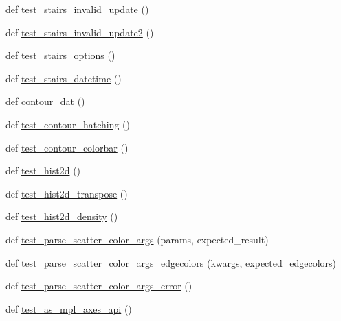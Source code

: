 \begin{DoxyCompactItemize}
\item 
def \hyperlink{namespacematplotlib_1_1tests_1_1test__axes_a11d3c5e980e30c826b84bbf145679e2f}{test\+\_\+stairs\+\_\+invalid\+\_\+update} ()
\item 
def \hyperlink{namespacematplotlib_1_1tests_1_1test__axes_a4537c0ae90a1171901db9b5c314dfbbf}{test\+\_\+stairs\+\_\+invalid\+\_\+update2} ()
\item 
def \hyperlink{namespacematplotlib_1_1tests_1_1test__axes_af69067a72b2dcc2d11f9943276b46e43}{test\+\_\+stairs\+\_\+options} ()
\item 
def \hyperlink{namespacematplotlib_1_1tests_1_1test__axes_ab921447cdab878f77f34771ca4746d5b}{test\+\_\+stairs\+\_\+datetime} ()
\item 
def \hyperlink{namespacematplotlib_1_1tests_1_1test__axes_a81737cb95742ecd5b58496ffb06f8951}{contour\+\_\+dat} ()
\item 
def \hyperlink{namespacematplotlib_1_1tests_1_1test__axes_ad40ed12418b59663d79d676878b6759f}{test\+\_\+contour\+\_\+hatching} ()
\item 
def \hyperlink{namespacematplotlib_1_1tests_1_1test__axes_a01ea7a002bc44d024474b1d6fba965ed}{test\+\_\+contour\+\_\+colorbar} ()
\item 
def \hyperlink{namespacematplotlib_1_1tests_1_1test__axes_a3b5c9f3b31be28c36aaee18f137043eb}{test\+\_\+hist2d} ()
\item 
def \hyperlink{namespacematplotlib_1_1tests_1_1test__axes_a331a62ae8de3e17f978e84ac7c76df08}{test\+\_\+hist2d\+\_\+transpose} ()
\item 
def \hyperlink{namespacematplotlib_1_1tests_1_1test__axes_aa24099d4f19ecd7876cbea6da41a0dad}{test\+\_\+hist2d\+\_\+density} ()
\item 
def \hyperlink{namespacematplotlib_1_1tests_1_1test__axes_a9e48c06173a5969ec5f5476a0817cf19}{test\+\_\+parse\+\_\+scatter\+\_\+color\+\_\+args} (params, expected\+\_\+result)
\item 
def \hyperlink{namespacematplotlib_1_1tests_1_1test__axes_a93c3acdd6e90c9d7b1821b0f88a1a892}{test\+\_\+parse\+\_\+scatter\+\_\+color\+\_\+args\+\_\+edgecolors} (kwargs, expected\+\_\+edgecolors)
\item 
def \hyperlink{namespacematplotlib_1_1tests_1_1test__axes_a6d5a191acc4a56861660ddd489e6db1d}{test\+\_\+parse\+\_\+scatter\+\_\+color\+\_\+args\+\_\+error} ()
\item 
def \hyperlink{namespacematplotlib_1_1tests_1_1test__axes_afdae7d53af359f9c1ffe01d34e2ac19d}{test\+\_\+as\+\_\+mpl\+\_\+axes\+\_\+api} ()

\end{DoxyCompactItemize}
